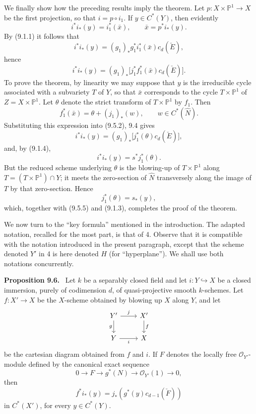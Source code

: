 \documentclass[11pt]{article}
\newenvironment{statement}[1]{\par\medskip\noindent\textbf{#1.}\ }{\par\medskip}
\begin{document}
We finally show how the preceding results imply the theorem. Let $p:X\times\mathbb P^1\to X$ be the first projection, so that $i=p\circ i_1$. If $y\in C^*(Y)$, then evidently
\[
i^*i_*(y)=i_1^*(\bar x),\qquad \bar x=p^*i_*(y).
\tag{9.5.1}
\]
By (9.1.1) it follows that
\[
i^*i_*(y)=(g_1)_*g_1^*i_1^*(\bar x)c_d(\check E),
\]
hence
\[
i^*i_*(y)=(g_1)_*\bigl[j_1^*f_1^*(\bar x)c_d(\check E)\bigr].
\tag{9.5.2}
\]
To prove the theorem, by linearity we may suppose that $y$ is the irreducible cycle associated with a subvariety $T$ of $Y$, so that $\bar x$ corresponds to the cycle $T\times\mathbb P^1$ of $Z=X\times\mathbb P^1$. Let $\theta$ denote the strict transform of $T\times\mathbb P^1$ by $f_1$. Then
\[
f_1^*(\bar x)=\theta+(j_1)_*(w),\qquad w\in C^*(\widehat N).
\tag{9.5.3}
\]
Substituting this expression into (9.5.2), 9.4 gives
\[
i^*i_*(y)=(g_1)_*\bigl[j_1^*(\theta)c_d(\check E)\bigr],
\tag{9.5.4}
\]
and, by (9.1.4),
\[
i^*i_*(y)=s^*j_1^*(\theta).
\tag{9.5.5}
\]
But the reduced scheme underlying $\theta$ is the blowing-up of $T\times\mathbb P^1$ along $T=(T\times\mathbb P^1)\cap Y$; it meets the zero-section of $\widehat N$ transversely along the image of $T$ by that zero-section. Hence
\[
j_1^*(\theta)=s_*(y),
\]
which, together with (9.5.5) and (9.1.3), completes the proof of the theorem.

We now turn to the ``key formula'' mentioned in the introduction. The adapted notation, recalled for the most part, is that of 4. Observe that it is compatible with the notation introduced in the present paragraph, except that the scheme denoted $Y'$ in 4 is here denoted $H$ (for ``hyperplane''). We shall use both notations concurrently.

\begin{statement}{Proposition 9.6}
Let $k$ be a separably closed field and let $i:Y\hookrightarrow X$ be a closed immersion, purely of codimension $d$, of quasi-projective smooth $k$-schemes. Let $f:X'\to X$ be the $X$-scheme obtained by blowing up $X$ along $Y$, and let
\[
\begin{tikzcd}
Y'\arrow[r,"j"]\arrow[d,"g"']&X'\arrow[d,"f"]\\
Y\arrow[r,"i"']&X
\end{tikzcd}
\]
be the cartesian diagram obtained from $f$ and $i$. If $F$ denotes the locally free $\mathcal O_{Y'}$-module defined by the canonical exact sequence
\[
0\to F\to g^*(N)\to\mathcal O_{Y'}(1)\to0,
\tag{9.6.1}
\]
then
\[
f^*i_*(y)=j_*(g^*(y)c_{d-1}(\check F))
\tag{9.6.2}
\]
in $C^*(X')$, for every $y\in C^*(Y)$.
\end{statement}
\end{document}
